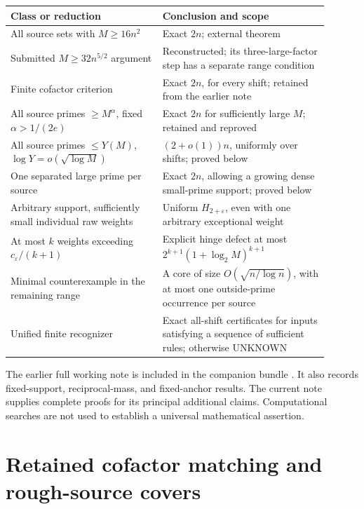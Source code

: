 \documentclass[11pt,a4paper]{article}
\theoremstyle{remark}
\begin{document}
\begin{center}
\small
\begin{tabular}{p{0.43\linewidth}p{0.47\linewidth}}
\toprule
Class or reduction & Conclusion and scope\\
\midrule
All source sets with \(M\ge16n^2\) & Exact \(2n\); external theorem \cite{Wang}\\
Submitted \(M\ge32n^{5/2}\) argument & Reconstructed; its three-large-factor step has a separate range condition\\
Finite cofactor criterion & Exact \(2n\), for every shift; retained from the earlier note\\
All source primes \(\ge M^\alpha\), fixed \(\alpha>1/(2e)\) & Exact \(2n\) for sufficiently large \(M\); retained and reproved\\
All source primes \(\le Y(M)\), \(\log Y=o(\sqrt{\log M})\) & \((2+o(1))n\), uniformly over shifts; proved below\\
One separated large prime per source & Exact \(2n\), allowing a growing dense small-prime support; proved below\\
Arbitrary support, sufficiently small individual raw weights & Uniform \(H_{2+\varepsilon}\), even with one arbitrary exceptional weight\\
At most \(k\) weights exceeding \(c_\varepsilon/(k+1)\) & Explicit hinge defect at most \(2^{k+1}(1+\log_2 M)^{k+1}\)\\
Minimal counterexample in the remaining range & A core of size \(O(\sqrt{n/\log n})\), with at most one outside-prime occurrence per source\\
Unified finite recognizer & Exact all-shift certificates for inputs satisfying a sequence of sufficient rules; otherwise UNKNOWN\\
\bottomrule
\end{tabular}
\end{center}

The earlier full working note is included in the companion bundle
\cite{Earlier}. It also records fixed-support, reciprocal-mass, and
fixed-anchor results. The current note supplies complete proofs for
its principal additional claims. Computational searches are not used
to establish a universal mathematical assertion.

\section{Retained cofactor matching and rough-source covers}
\label{root:hall}
\end{document}
